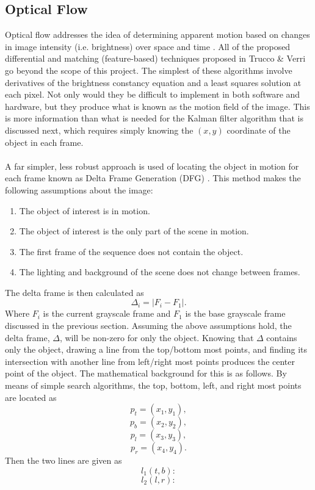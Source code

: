 \documentclass[12pt]{article} %
\begin{document}
\subsection{Optical Flow}
Optical flow addresses the idea of determining apparent motion based on changes in image intensity (i.e. brightness) over space and time \cite{4}. All of the proposed differential and matching (feature-based) techniques proposed in Trucco \& Verri \cite{4} go beyond the scope of this project. The simplest of these algorithms involve derivatives of the brightness constancy equation and a least squares solution at each pixel. Not only would they be difficult to implement in both software and hardware, but they produce what is known as the motion field of the image. This is more information than what is needed for the Kalman filter algorithm that is discussed next, which requires simply knowing the $(x,y)$ coordinate of the object in each frame. \\\\
A far simpler, less robust approach is used of locating the object in motion for each frame known as Delta Frame Generation (DFG) \cite{8}. This method makes the following assumptions about the image:
\begin{enumerate}
\item The object of interest is in motion.
\item The object of interest is the only part of the scene in motion.
\item The first frame of the sequence does not contain the object.
\item The lighting and background of the scene does not change between frames.
\end{enumerate}
The delta frame is then calculated as 
\begin{equation}
\Delta_i = | F_i - F_1 |.
\end{equation}
Where $F_i$ is the current grayscale frame and $F_1$ is the base grayscale frame discussed in the previous section. Assuming the above assumptions hold, the delta frame, $\Delta$, will be non-zero for only the object. Knowing that $\Delta$ contains only the object, drawing a line from the top/bottom most points, and finding its intersection with another line from left/right most points produces the center point of the object. The mathematical background for this is as follows. By means of simple search algorithms, the top, bottom, left, and right most points are located as
\[
p_t = (x_1, y_1) ,
\]
\[
p_b = (x_2, y_2) ,
\]
\[
p_l = (x_3, y_3) ,
\]
\[
p_r = (x_4, y_4) .
\]
Then the two lines are given as 
\[
l_1(t,b):
\]
\[
l_2(l,r):
\]
\end{document}
